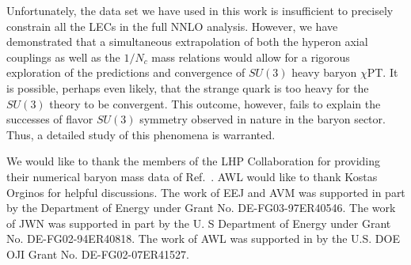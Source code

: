 \documentclass[twocolumn,nofootinbib,prd,aps,superscriptaddress,tightenlines]{revtex4}
\begin{document}
Unfortunately, the data set we have used in this work is insufficient to precisely constrain all the LECs in the full NNLO analysis.  However, we have demonstrated that a simultaneous extrapolation of both the hyperon axial couplings as well as the $1/N_c$ mass relations would allow for a rigorous exploration of the predictions and convergence of $SU(3)$ heavy baryon $\chi$PT.  It is possible, perhaps even likely, that the strange quark is too heavy for the $SU(3)$ theory to be convergent.  This outcome, however, fails to explain the successes of flavor $SU(3)$ symmetry observed in nature in the baryon sector.  Thus,  a detailed study of this phenomena is warranted.




\begin{acknowledgements}
We would like to thank the members of the LHP Collaboration for providing their numerical baryon mass data of Ref.~\cite{WalkerLoud:2008bp}.  AWL would like to thank Kostas Orginos for helpful discussions.  The work of EEJ and AVM was supported in part by the Department of Energy under Grant No. DE-FG03-97ER40546.  The work of JWN was supported in part by the U. S Department of Energy under Grant No. DE-FG02-94ER40818.  The work of AWL was supported in by the U.S. DOE OJI Grant No. DE-FG02-07ER41527.
\end{acknowledgements}
\end{document}
